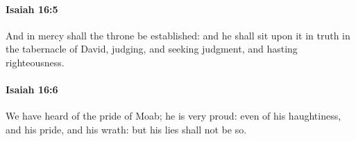 		\paragraph{Isaiah 16:5} %
			\label{ISAIAH-16-5}

			And in mercy shall the throne be established: and he shall sit upon it in truth in the tabernacle of David, judging, and seeking judgment, and hasting righteousness.


		\paragraph{Isaiah 16:6} %
			\label{ISAIAH-16-6}

			We have heard of the pride of Moab; he is very proud: even of his haughtiness, and his pride, and his wrath: but his lies shall not be so.


